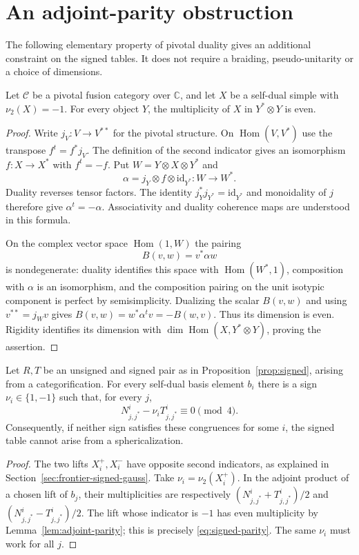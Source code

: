 \section{An adjoint-parity obstruction}\label{sec:adjoint-parity}
The following elementary property of pivotal duality gives an additional
constraint on the signed tables. It does not require a braiding,
pseudo-unitarity or a choice of dimensions.

\begin{lemma}\label{lem:adjoint-parity}
Let $\mathcal C$ be a pivotal fusion category over $\mathbb C$, and let
$X$ be a self-dual simple with $\nu_2(X)=-1$. For every object $Y$,
the multiplicity of $X$ in $Y^*\otimes Y$ is even.
\end{lemma}
\begin{proof}
Write $j_V:V\longrightarrow V^{**}$ for the pivotal structure. On
$\operatorname{Hom}(V,V^*)$ use the transpose $f^t=f^*j_V$.
The definition of the second indicator gives an isomorphism
$f:X\longrightarrow X^*$ with $f^t=-f$.
Put $W=Y\otimes X\otimes Y^*$ and
\[
 \alpha=j_Y\otimes f\otimes\mathrm{id}_{Y^*}:W\longrightarrow W^*.
\]
Duality reverses tensor factors. The identity
$j_Y^*j_{Y^*}=\mathrm{id}_{Y^*}$ and monoidality of $j$ therefore give
$\alpha^t=-\alpha$. Associativity and duality coherence maps are
understood in this formula.

On the complex vector space $\operatorname{Hom}(1,W)$ the pairing
\[
 B(v,w)=v^*\alpha w
\]
is nondegenerate: duality identifies this space with
$\operatorname{Hom}(W^*,1)$, composition with $\alpha$ is an
isomorphism, and the composition pairing on the unit isotypic component
is perfect by semisimplicity. Dualizing the scalar $B(v,w)$ and using
$v^{**}=j_Wv$ gives
$B(v,w)=w^*\alpha^t v=-B(w,v)$. Thus its dimension is even.
Rigidity identifies its dimension with
$\dim\operatorname{Hom}(X,Y^*\otimes Y)$, proving the assertion.
\end{proof}

\begin{corollary}\label{cor:signed-parity}
Let $R,T$ be an unsigned and signed pair as in
Proposition~\ref{prop:signed}, arising from a categorification.
For every self-dual basis element $b_i$ there is a sign
$\nu_i\in\{1,-1\}$ such that, for every $j$,
\begin{equation}\label{eq:signed-parity}
 N_{j,j^*}^{i}-\nu_i T_{j,j^*}^{i}\equiv0\pmod4.
\end{equation}
Consequently, if neither sign satisfies these congruences for some $i$,
the signed table cannot arise from a sphericalization.
\end{corollary}
\begin{proof}
The two lifts $X_i^+,X_i^-$ have opposite second indicators, as explained
in Section~\ref{sec:frontier-signed-gauss}. Take
$\nu_i=\nu_2(X_i^+)$. In the adjoint product of a chosen lift of $b_j$,
their multiplicities are respectively
$(N_{j,j^*}^{i}+T_{j,j^*}^{i})/2$ and
$(N_{j,j^*}^{i}-T_{j,j^*}^{i})/2$.
The lift whose indicator is $-1$ has even multiplicity by
Lemma~\ref{lem:adjoint-parity}; this is precisely
\eqref{eq:signed-parity}. The same $\nu_i$ must work for all $j$.
\end{proof}

